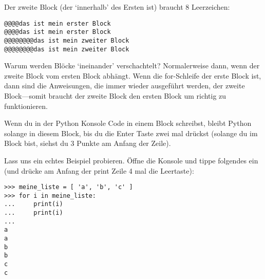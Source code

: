 Der zweite Block (der `innerhalb' des Ersten ist) braucht 8 Leerzeichen:

\begin{Verbatim}[frame=single]
@@@@das ist mein erster Block
@@@@das ist mein erster Block
@@@@@@@@das ist mein zweiter Block
@@@@@@@@das ist mein zweiter Block
\end{Verbatim}

Warum werden Blöcke `ineinander' verschachtelt? Normalerweise dann, wenn der zweite Block vom ersten Block abhängt. Wenn die for-Schleife der erste Block ist, dann sind die Anweisungen, die immer wieder ausgeführt werden, der zweite Block---somit braucht der zweite Block den ersten Block um richtig zu funktionieren.

Wenn du in der Python Konsole Code in einem Block schreibst, bleibt Python solange in diesem Block, bis du die Enter Taste zwei mal drückst (solange du im Block bist, siehst du 3 Punkte am Anfang der Zeile).

Lass uns ein echtes Beispiel probieren. Öffne die Konsole und tippe folgendes ein (und drücke am Anfang der print Zeile 4 mal die Leertaste):

\begin{Verbatim}[frame=single]
>>> meine_liste = [ 'a', 'b', 'c' ]
>>> for i in meine_liste:
...     print(i)
...     print(i)
...
a
a
b
b
c
c
\end{Verbatim}

